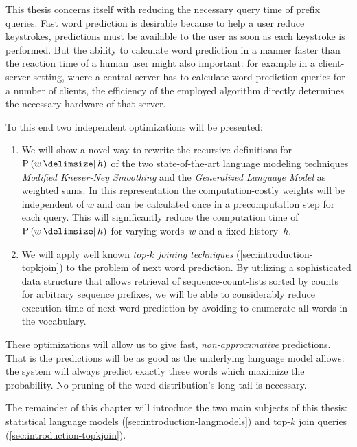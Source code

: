 This thesis concerns itself with reducing the necessary query time of prefix
queries.
Fast word prediction is desirable because to help a user reduce keystrokes,
predictions must be available to the user as soon as each keystroke is
performed.
But the ability to calculate word prediction in a manner faster than the reaction
time of a human user might also important:
for example in a client-server setting, where a central server has to calculate
word prediction queries for a number of clients, the efficiency of the employed
algorithm directly determines the necessary hardware of that server.

To this end two independent optimizations will be presented:
\begin{enumerate}
  \item We will show a novel way to rewrite the recursive definitions for
    $\Prob{w}{h}$ of the two state-of-the-art language modeling techniques
    \emph{Modified Kneser-Ney Smoothing} and the \emph{Generalized Language
    Model} as weighted sums.
    In this representation the com\-pu\-ta\-tion-costly weights will be
    independent of $w$ and can be calculated once in a precomputation step for
    each query.
    This will significantly reduce the computation time of $\Prob{w}{h}$ for
    varying words~$w$ and a fixed history~$h$.
  \item We will apply well known \emph{top-$k$ joining techniques}
    (\cref{sec:introduction-topkjoin}) to the problem of next word prediction.
    By utilizing a sophisticated data structure that allows retrieval of
    sequence-count-lists sorted by counts for arbitrary sequence prefixes,
    we will be able to considerably reduce execution time of next word
    prediction by avoiding to enumerate all words in the vocabulary.
\end{enumerate}

These optimizations will allow us to give fast, \emph{non-approximative}
predictions.
That is the predictions will be as good as the underlying language model allows:
the system will always predict exactly these words which maximize the
probability.
No pruning of the word distribution's long tail is necessary.

The remainder of this chapter will introduce the two main subjects of this
thesis: statistical language models (\cref{sec:introduction-langmodels}) and
top-$k$ join queries (\cref{sec:introduction-topkjoin}).



